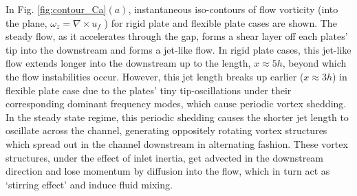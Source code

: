 \documentclass[%
aip,
amsmath,amssymb,
reprint,
]{revtex4-1}
\begin{document}
		In Fig. \ref{fig:contour_Ca}$(a)$, instantaneous iso-contours of flow vorticity (into the plane, $\omega_z=\nabla\times u_f$ ) for rigid plate and flexible plate cases are shown. The steady flow, as it accelerates through the gap, forms a shear layer off each plates' tip into the downstream and forms a jet-like flow. In rigid plate cases, this jet-like flow extends longer into the downstream up to the length, $x\approx5h$, beyond which the flow instabilities occur. However, this jet length breaks up earlier ($x\approx3h$) in flexible plate case due to the plates' tiny tip-oscillations under their corresponding dominant frequency modes, which cause periodic vortex shedding. In the steady state regime, this periodic shedding causes the shorter jet length to oscillate across the channel, generating oppositely rotating vortex structures which spread out in the channel downstream in alternating fashion. These vortex structures, under the effect of inlet inertia, get advected in the downstream direction and lose momentum by diffusion into the flow, which in turn act as `stirring effect' and induce fluid mixing.
\end{document}

